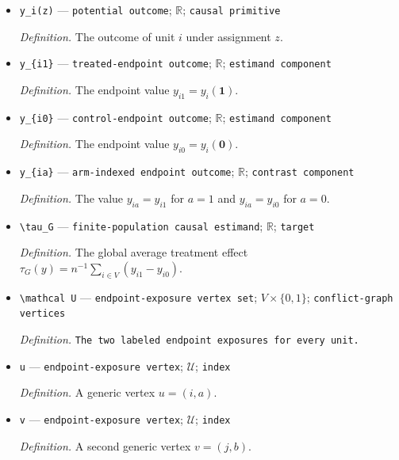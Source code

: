 \documentclass{article}
\begin{document}
\begin{itemize}
  \par\smallskip\noindent\emph{Definition.} \texttt{A fixed finite-\allowbreak{}population potential-\allowbreak{}outcome schedule.}
  \item \texttt{y\_\allowbreak{}i(z)} --- \texttt{potential outcome}; \(\mathbb R\); \texttt{causal primitive}
  \par\smallskip\noindent\emph{Definition.} The outcome of unit \(i\) under assignment \(z\).
  \item \texttt{y\_\allowbreak{}\{i1\}\allowbreak{}} --- \texttt{treated-\allowbreak{}endpoint outcome}; \(\mathbb R\); \texttt{estimand component}
  \par\smallskip\noindent\emph{Definition.} The endpoint value \(y_{i1}=y_i(\boldsymbol 1)\).
  \item \texttt{y\_\allowbreak{}\{i0\}\allowbreak{}} --- \texttt{control-\allowbreak{}endpoint outcome}; \(\mathbb R\); \texttt{estimand component}
  \par\smallskip\noindent\emph{Definition.} The endpoint value \(y_{i0}=y_i(\boldsymbol 0)\).
  \item \texttt{y\_\allowbreak{}\{ia\}\allowbreak{}} --- \texttt{arm-\allowbreak{}indexed endpoint outcome}; \(\mathbb R\); \texttt{contrast component}
  \par\smallskip\noindent\emph{Definition.} The value \(y_{ia}=y_{i1}\) for \(a=1\) and \(y_{ia}=y_{i0}\) for \(a=0\).
  \item \texttt{\textbackslash{}\allowbreak{}tau\_\allowbreak{}G} --- \texttt{finite-\allowbreak{}population causal estimand}; \(\mathbb R\); \texttt{target}
  \par\smallskip\noindent\emph{Definition.} The global average treatment effect \(\tau_G(y)=n^{-1}\sum_{i\in V}(y_{i1}-y_{i0})\).
  \item \texttt{\textbackslash{}\allowbreak{}mathcal U} --- \texttt{endpoint-\allowbreak{}exposure vertex set}; \(V\times\{0,1\}\); \texttt{conflict-\allowbreak{}graph vertices}
  \par\smallskip\noindent\emph{Definition.} \texttt{The two labeled endpoint exposures for every unit.}
  \item \texttt{u} --- \texttt{endpoint-\allowbreak{}exposure vertex}; \(\mathcal U\); \texttt{index}
  \par\smallskip\noindent\emph{Definition.} A generic vertex \(u=(i,a)\).
  \item \texttt{v} --- \texttt{endpoint-\allowbreak{}exposure vertex}; \(\mathcal U\); \texttt{index}
  \par\smallskip\noindent\emph{Definition.} A second generic vertex \(v=(j,b)\).

\end{itemize}
\end{document}
